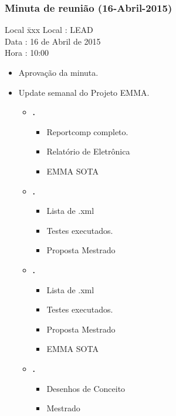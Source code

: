 \subsubsection{Minuta de reunião (16-Abril-2015)}

\begin{tabbing}
  Local \= xxx \kill
  Local \> : LEAD \\
  Data  \> : 16 de Abril de 2015 \\
  Hora  \> : 10:00
\end{tabbing}


\begin{itemize}
  \item Aprovação da minuta.

  \item Update semanal do Projeto EMMA.
  
  \begin{itemize}
    \item \textbf{\renan.} 
		\begin{itemize}    
			 \item Reportcomp completo.
			 \item Relatório de Eletrônica
			 \item EMMA SOTA 
			
		\end{itemize}
		
		
    \item \textbf{\elael.} 
    		\begin{itemize}    
			 \item Lista de .xml
			 \item Testes executados.
			 \item Proposta Mestrado
			\end{itemize}
					
			
    \item \textbf{\gabriel.} 
    		\begin{itemize}    
			 \item Lista de .xml
			 \item Testes executados.
			 \item Proposta Mestrado
			 \item EMMA SOTA
			\end{itemize}

		 \item \textbf{\julia.} 
    		\begin{itemize}    
			 \item Desenhos de Conceito
			 \item Mestrado
			\end{itemize}


\end{itemize}
\end{itemize}
